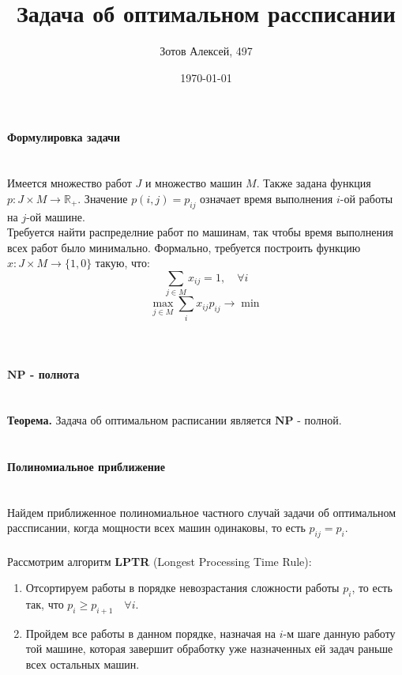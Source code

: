 \documentclass[10pt]{article}
\title{Задача об оптимальном рассписании}
\author{Зотов Алексей, 497}
\date{\today}
\begin{document}
\maketitle
\paragraph{\Large {Формулировка задачи\\\\}} 

\indent Имеется множество работ $J$ и множество машин $M$. Также задана функция $p: J \times M \to \mathbb{R}_+$. Значение $p(i,j) = p_{ij}$ означает время выполнения $i$-ой работы на $j$-ой машине. \\
Требуется найти распределние работ по машинам, так чтобы время выполнения всех работ было минимально. Формально, требуется построить функцию $x : J \times M \to \{1,0\}$ такую, что: 
\begin{equation}
    \sum_{j \in M} x_{ij} = 1 , \quad \forall i
\end{equation}
\begin{equation}
    \max_{j \in M} \sum_{i} x_{ij} p_{ij} \to \min 
\end{equation}
\\
\\
\paragraph{\Large{$\mathbf{NP}$ - полнота\\\\}}
\indent \textbf{Теорема.} Задача об оптимальном расписании является $\mathbf{NP}$ - полной.
\\
\\
\paragraph{\Large{Полиномиальное приближение\\\\}}
\indent Найдем приближенное полиномиальное частного случай задачи об оптимальном рассписании, когда мощности всех машин одинаковы, то есть $p_{ij} = p_i$. \\ \\ 
Рассмотрим алгоритм \textbf{LPTR} (Longest Processing Time Rule): \\
\begin{enumerate}
    \item Отсортируем работы в порядке невозрастания сложности работы $p_i$, то есть так, что $p_i \geq p_{i+1} \quad \forall i$. 
    \item Пройдем все работы в данном порядке, назначая на $i$-м шаге данную работу той машине, которая завершит обработку уже назначенных ей задач раньше всех остальных машин.
\end{enumerate}
\end{document}
